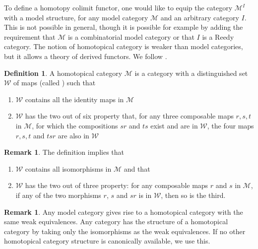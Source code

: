 \documentclass{scrartcl}
\let\emph\relax
\theoremstyle{plain}
\theoremstyle{definition}
\newtheorem{definition}[theorem]{Definition}
\newtheorem{remark}[theorem]{Remark}
\newcommand{\cat}[1]{\mathcal{#1}}
\begin{document}
To define a homotopy colimit functor, one would like to equip the category $\cat M^I$ with a model structure, for any model category $\cat M$ and an arbitrary category $I$. This is not possible in general, though it is possible for example by adding the requirement that $\cat M$ is a combinatorial model category or that $I$ is a Reedy category. The notion of homotopical category is weaker than model categories, but it allows a theory of derived functors. We follow \cite[2.1 and 2.2]{riehl_2014}.

\begin{definition}
    A homotopical category $\cat M$ is a category with a distinguished set $\cat W$ of maps (called \emph{weak equivalences}) such that 
    \begin{enumerate}
        \item $\cat W$ contains all the identity maps in $\cat M$
        \item $\cat W$ has the two out of six property that, for any three composable maps $r, s, t$ in $\cat M$, for which the compositions $sr$ and $ts$ exist and are in $\cat W$, the four maps $r, s, t$ and $tsr$ are also in $\cat W$
    \end{enumerate}
\end{definition}
\begin{remark}
The definition implies that \begin{enumerate}\item $\cat W$ contains all isomorphisms in $\cat M$ and that \item $\cat W$ has the two out of three property: for any composable maps $r$ and $s$ in $\cat M$, if any of the two morphisms $r$, $s$ and $sr$ is in $\cat W$, then so is the third.
\end{enumerate}
\end{remark}
\begin{remark}
Any model category gives rise to a homotopical category with the same weak equivalences. Any category has the structure of a homotopical category by taking only the isomorphisms as the weak equivalences. If no other homotopical category structure is canonically available, we use this. 
\end{remark}
\end{document}
